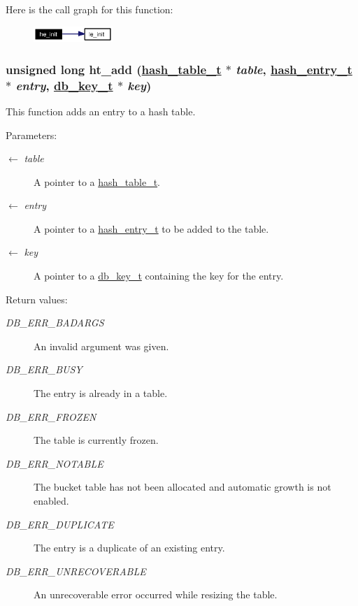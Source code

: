 Here is the call graph for this function:\begin{figure}[H]
\begin{center}
\leavevmode
\includegraphics[width=85pt]{group__dbprim__hash_ga18_cgraph}
\end{center}
\end{figure}
\hypertarget{group__dbprim__hash_ga10}{
\subsubsection[ht\_\-add]{\setlength{\rightskip}{0pt plus 5cm}unsigned long ht\_\-add (\hyperlink{struct__hash__table__s}{hash\_\-table\_\-t} $\ast$ {\em table}, \hyperlink{struct__hash__entry__s}{hash\_\-entry\_\-t} $\ast$ {\em entry}, \hyperlink{struct__db__key__s}{db\_\-key\_\-t} $\ast$ {\em key})}}
\label{group__dbprim__hash_ga10}


This function adds an entry to a hash table.

\begin{Desc}
\item[Parameters:]
\begin{description}
\item[\mbox{$\leftarrow$} {\em table}]A pointer to a \hyperlink{group__dbprim__hash_ga1}{hash\_\-table\_\-t}. \item[\mbox{$\leftarrow$} {\em entry}]A pointer to a \hyperlink{group__dbprim__hash_ga2}{hash\_\-entry\_\-t} to be added to the table. \item[\mbox{$\leftarrow$} {\em key}]A pointer to a \hyperlink{group__dbprim_ga0}{db\_\-key\_\-t} containing the key for the entry.\end{description}
\end{Desc}
\begin{Desc}
\item[Return values:]
\begin{description}
\item[{\em DB\_\-ERR\_\-BADARGS}]An invalid argument was given. \item[{\em DB\_\-ERR\_\-BUSY}]The entry is already in a table. \item[{\em DB\_\-ERR\_\-FROZEN}]The table is currently frozen. \item[{\em DB\_\-ERR\_\-NOTABLE}]The bucket table has not been allocated and automatic growth is not enabled. \item[{\em DB\_\-ERR\_\-DUPLICATE}]The entry is a duplicate of an existing entry. \item[{\em DB\_\-ERR\_\-UNRECOVERABLE}]An unrecoverable error occurred while resizing the table.\end{description}
\end{Desc}


